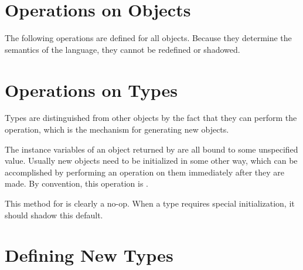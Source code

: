 

\section{Operations on Objects}

The following operations are defined for all objects.  Because they
determine the semantics of the language, they cannot be redefined or shadowed.





\section{Operations on Types}

Types are distinguished from other objects by the fact that they can
perform the  operation, which is the mechanism for generating
new objects.


The instance variables of an object returned by  are
all bound to some unspecified value.  Usually new objects need to be
initialized in some other way, which can be accomplished by performing
an operation on them immediately after they are made.  By convention,
this operation is .


This method for  is clearly a no-op.  When a type
requires special initialization, it should shadow this default.

\section{Defining New Types}

